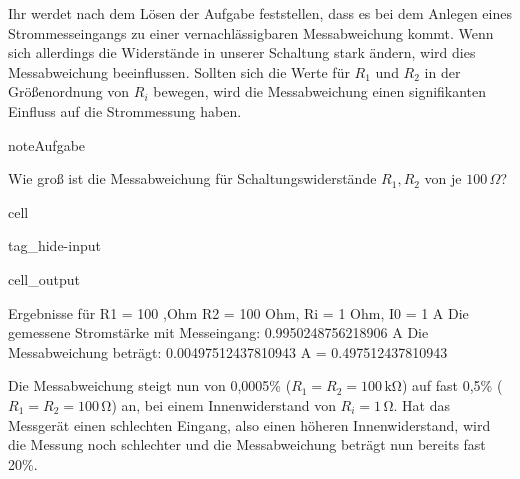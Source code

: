 \documentclass[letterpaper,10pt,english]{jupyterBook}
\begin{document}
\sphinxAtStartPar
Ihr werdet nach dem Lösen der Aufgabe feststellen, dass es bei dem Anlegen eines Strommesseingangs zu einer vernachlässigbaren Messabweichung kommt. Wenn sich allerdings die Widerstände in unserer Schaltung stark ändern, wird dies Messabweichung beeinflussen. Sollten sich die Werte für \(R_1\) und \(R_2\) in der Größenordnung von \(R_i\) bewegen, wird die Messabweichung einen signifikanten Einfluss auf die Strommessung haben.

\begin{sphinxadmonition}{note}{Aufgabe}

\sphinxAtStartPar
Wie groß ist die Messabweichung für Schaltungswiderstände \(R_1, R_2\) von je \(100\,\Omega\)?
\end{sphinxadmonition}

\begin{sphinxuseclass}{cell}
\begin{sphinxuseclass}{tag_hide-input}\begin{sphinxVerbatimOutput}

\begin{sphinxuseclass}{cell_output}
\begin{sphinxVerbatim}[commandchars=\\\{\}]
Ergebnisse für R\PYGZus{}1 = 100 ,Ohm R\PYGZus{}2 = 100 Ohm, R\PYGZus{}i = 1 Ohm, I\PYGZus{}0 = 1 A
Die gemessene Stromstärke mit Messeingang:  0.9950248756218906 A
Die Messabweichung beträgt:  \PYGZhy{}0.00497512437810943 A =  0.497512437810943 \PYGZpc{}
\end{sphinxVerbatim}

\end{sphinxuseclass}\end{sphinxVerbatimOutput}

\end{sphinxuseclass}
\end{sphinxuseclass}
\sphinxAtStartPar
Die Messabweichung steigt nun von 0,0005\% (\(R_1 = R_2 = 100\,\mathrm{k\Omega}\)) auf fast 0,5\% (\(R_1 = R_2 = 100\,\mathrm{\Omega}\)) an, bei einem Innenwiderstand von \(R_i = 1\,\mathrm{\Omega}\). Hat das Messgerät einen schlechten Eingang, also einen höheren Innenwiderstand, wird die Messung noch schlechter und die Messabweichung beträgt nun bereits fast 20\%.
\end{document}
